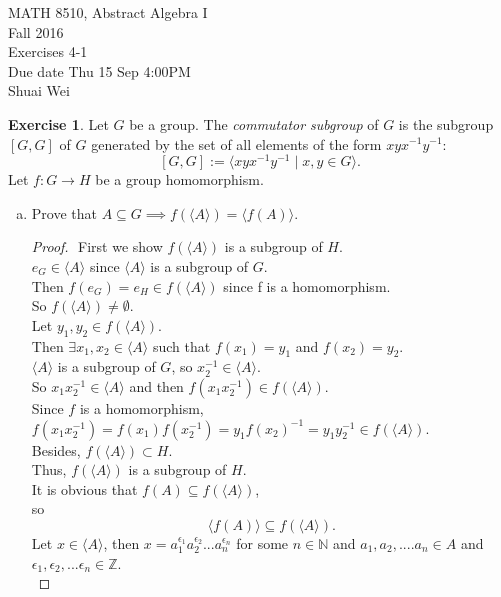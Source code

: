 \documentclass{amsart}
\newcommand{\bbz}{\mathbb{Z}}
\newcommand{\bbn}{\mathbb{N}}
\theoremstyle{plain}
\theoremstyle{definition}
\newtheorem{exer}[lem]{Exercise}
\begin{document}
\noindent MATH 8510, Abstract Algebra I \\
Fall 2016\\
Exercises 4-1\\
Due date Thu 15 Sep 4:00PM\\
Shuai Wei
\

%
%


\begin{exer}
Let $G$ be a group. 
The \emph{commutator subgroup} of $G$ is the subgroup $[G,G]$ of $G$ generated by the set of all elements of the form $xyx^{-1}y^{-1}$:
$$[G,G]:=\langle xyx^{-1}y^{-1}\mid x,y\in G\rangle.$$
Let $f\colon G\to H$ be a group homomorphism.
\begin{enumerate}[(a)]
\item Prove that $A\subseteq G\implies f(\langle A\rangle)=\langle f(A)\rangle$.
	\begin{proof}
		$ $\newline
		First we show $f(\langle A\rangle)$ is a subgroup of $H$.\\
		$e_G \in \langle A\rangle$ since $\langle A \rangle$ is a subgroup of $G$.\\
		Then $f(e_G) = e_H \in f(\langle A \rangle)$ since f is a homomorphism.\\
		So $f(\langle A\rangle) \neq \emptyset$.\\
		Let $y_1, y_2 \in f(\langle A\rangle)$. \\
		Then $\exists x_1, x_2 \in \langle A\rangle$ such that $f(x_1) = y_1 $ and $f(x_2) = y_2$.\\
		$\langle A\rangle$ is a subgroup of $G$, so $x_2^{-1} \in \langle A\rangle$.\\
		So $x_1x_2^{-1} \in \langle A\rangle$ and then $f(x_1x_2^{-1}) \in f(\langle A\rangle)$.\\
		Since $f$ is a homomorphism, \\
		$f(x_1x_2^{-1}) = f(x_1)f(x_2^{-1}) =y_1f(x_2)^{-1} = y_1y_2^{-1} \in f(\langle A\rangle)$.\\
		Besides, $f(\langle A\rangle) \subset H$.\\ 
		Thus, $f(\langle A\rangle)$ is a subgroup of $H$.\\
		It is obvious that $f(A) \subseteq f(\langle A\rangle)$, \\
		so 
		$$\langle f(A) \rangle \subseteq f(\langle A\rangle).$$
		Let $x \in \langle A \rangle$, then $x = a_1^{\epsilon_1}a_2^{\epsilon_2}...a_n^{\epsilon_n}$ for some $n \in \bbn$ and $a_1,a_2,....a_n \in A$ and $\epsilon_1,\epsilon_2,...\epsilon_n \in \bbz$.\\

\end{proof}
\end{enumerate}
\end{exer}
\end{document}

